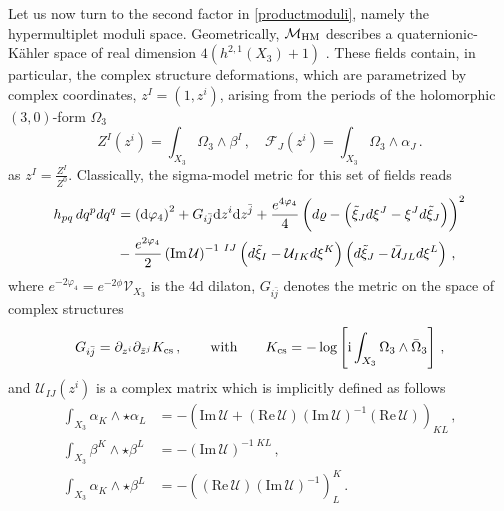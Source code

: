 Let us now turn to the second factor in \eqref{productmoduli}, namely the hypermultiplet moduli space. Geometrically, $\mathcal{M}_{\rm HM}$ describes a quaternionic-K\"ahler space of real dimension $4(h^{2,1} (X_3)+1)$ \cite{Bagger:1983tt}. These fields contain, in particular, the complex structure deformations, which are parametrized by complex coordinates, $z^I= \left(1, z^i \right)$, arising from the periods of the holomorphic $(3,0)$-form $\Omega_3$
%
\begin{equation}\label{eq:CSmoduli}
	Z^I (z^i) = \int_{X_3} \Omega_3 \wedge \beta^I\, , \quad \mathcal{F}_J (z^i) = \int_{X_3} \Omega_3 \wedge \alpha_J\, .
\end{equation}
%
as $z^I = \frac{Z^I}{Z^0}$. Classically, the sigma-model metric for this set of fields reads \cite{Ferrara:1989ik,Cecotti:1988zx}
%
\begin{align}\label{eq:classicalhypermetric}
	h_{p q}\, d q^p d q^q &= \left( {\rm d} \varphi_4\right)^2 + G_{i \bar j} {\rm d} z^i {\rm d} z^{\bar j} + \frac{e^{4\varphi_4}}{4} \left( d \varrho - \left( \tilde{\xi}_J d\xi^J-\xi^J d\tilde{\xi}_J \right)\right)^2 \notag\\
	& -\frac{e^{2\varphi_4}}{2} \left( \text{Im}\, \mathcal{U}\right)^{-1\ IJ} \left( d\tilde{\xi}_I -\mathcal{U}_{IK} d\xi^K\right) \left( d\tilde{\xi}_J -\bar{\mathcal{U}}_{JL} d\xi^L\right)\, ,
\end{align}
%
where $e^{-2\varphi_4}= e^{-2\phi}\mathcal{V}_{X_3}$ is the 4d dilaton, $G_{i \bar j}$ denotes the metric on the space of complex structures \cite{Candelas:1990pi}
%
\begin{equation}\label{eq:CSmetric}
	G_{i\bar j} = \partial_{z^i}\partial_{\bar z^j} K_{\text{cs}} \, ,\qquad \text{with}\qquad K_{\text{cs}}=-\log \left[{\rm i} \int_{X_3}\Omega_3 \wedge \bar \Omega_3 \right]\, ,
\end{equation}
%
and $\mathcal{U}_{IJ} (z^i)$ is a complex matrix which is implicitly defined as follows
%
\begin{equation}\label{eq:hypermatrix}
\begin{aligned}
\int_{X_3} \alpha_K\wedge \star \alpha_L &= -\left(\text{Im}\, \mathcal{U} +(\text{Re}\, \mathcal{U})(\text{Im}\, \mathcal{U})^{-1}(\text{Re}\, \mathcal{U})\right)_{KL}\, ,\\
\int_{X_3} \beta^K\wedge \star \beta^L &=- \left(\text{Im}\, \mathcal{U}\right)^{-1\;KL}\, ,\\
\int_{X_3} \alpha_K\wedge \star \beta^L &=- \left((\text{Re}\, \mathcal{U})(\text{Im}\, \mathcal{U})^{-1}\right)^K_L\, . 
\end{aligned}
\end{equation}
%

